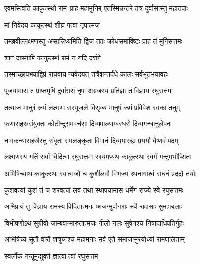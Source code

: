 
\twolineshloka
{एवमस्त्विति काकुत्स्थो रामः प्राह महामुनिम्}
{एतस्मिन्नन्तरे तत्र दुर्वासास्तु महातपाः}%


\onelineshloka
{मां निवेदय काकुत्स्थं शीघ्रं गत्वा नृपात्मज}%


\twolineshloka
{तमब्रवील्लक्ष्मणस्तु असान्निध्यमिति द्विज}
{ततः क्रोधसमाविष्टः प्राह तं मुनिसत्तमः}%


शापं दास्यामि काकुत्स्थं रामं न यदि दर्शये


\twolineshloka
{तस्माच्छापभयाद्विप्रं राघवाय न्यवेदयत्}
{तत्रैवान्तर्दधे कालः सर्वभूतभयावहः}%

\twolineshloka
{पूजयामास तं प्राप्तमृषिं दुर्वाससं नृपः}
{अग्रजस्य प्रतिज्ञा तं विज्ञाय रघुसत्तमः}%

\twolineshloka
{तत्याज मानुषं रूपं लक्ष्मणः सरयूजले}
{विसृज्य मानुषं रूपं प्रविवेश स्वकां तनुम्}%

\twolineshloka
{फणासहस्रसंयुक्तः कोटीन्दुसमवर्चसः}
{दिव्यमाल्याम्बरधरो दिव्यगन्धानुलेपनः}%

\twolineshloka
{नागकन्यासहस्रैस्तु संवृतः समलङ्कृतः}
{विमानं दिव्यमारुह्य प्रययौ वैष्णवं पदम्}%

\twolineshloka
{लक्ष्मणस्य गतिं सर्वां विदित्वा रघुसत्तमः}
{स्वयमप्यथ काकुत्स्थः स्वर्गं गन्तुमभीप्सितः}%

\twolineshloka
{अभिषिच्याथ काकुत्स्थः स्वात्मजौ च कुशीलवौ}
{विभज्य रथनागाश्वं सधनं प्रददौ तयोः}%

\twolineshloka
{कुशवत्यां कुशं तं च शरवत्यां लवं तथा}
{स्थापयामास धर्मेण राज्ये स्वे रघुसत्तमः}%

\twolineshloka
{अभिप्रायं तु विज्ञाय रामस्य विदितात्मनः}
{आजग्मुर्वानराः सर्वे राक्षसाः सुमहाबलाः}%

\twolineshloka
{विभीषणोऽथ सुग्रीवो जाम्बवान्मारुतात्मजः}
{नीलो नलः सुषेणश्च निषादाधिपतिर्गुहः}%

\twolineshloka
{अभिषिच्य सुतौ वीरौ शत्रुघ्नश्च महामनाः}
{सर्व एते समाजग्मुरयोध्यां रामपालिताम्}%



\onelineshloka
{स्वर्लोकं गन्तुमुद्युक्तं ज्ञात्वा त्वां रघुसत्तम}%


